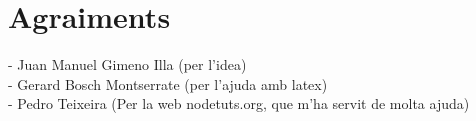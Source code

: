 \chapter*{Agraiments}

- Juan Manuel Gimeno Illa (per l'idea) \\
- Gerard Bosch Montserrate (per l'ajuda amb latex) \\
- Pedro Teixeira (Per la web nodetuts.org, que m'ha servit de molta ajuda) \\
